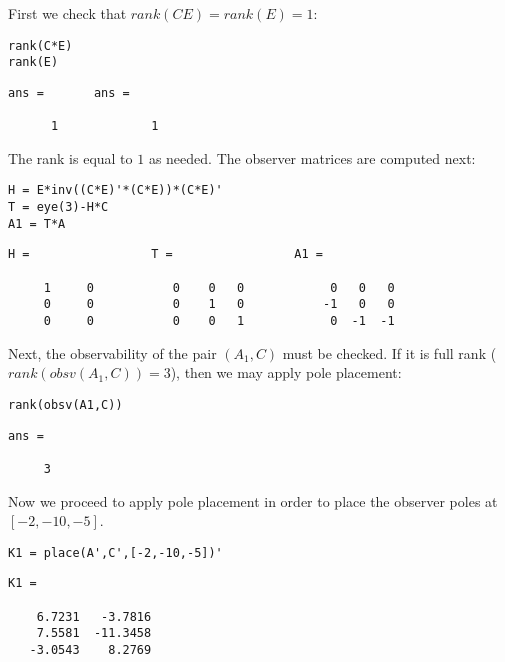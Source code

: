 \documentclass{amsart}
\theoremstyle{definition}
\theoremstyle{remark}
\numberwithin{equation}{section}
\begin{document}
\begin{par}
\noindent First we check that $rank(CE) = rank(E) = 1$:
\end{par} 
\begin{verbatim}
rank(C*E)
rank(E)
\end{verbatim}

        \color{lightgray} \begin{verbatim}
ans =       ans =

      1             1
\end{verbatim} \color{black}

\begin{par}
The rank is equal to $1$ as needed. The observer matrices are computed next:
\end{par}



\begin{verbatim}
H = E*inv((C*E)'*(C*E))*(C*E)'
T = eye(3)-H*C
A1 = T*A
\end{verbatim}
        \color{lightgray} \begin{verbatim}
H =                 T =                 A1 =

     1     0           0    0   0            0   0   0
     0     0           0    1   0           -1   0   0
     0     0           0    0   1            0  -1  -1

\end{verbatim} \color{black}

\begin{par}
Next, the observability of the pair $(A_1,C)$ must be checked. If it is full rank ($rank(obsv(A_1,C))=3$), then we may apply pole placement:
\end{par}
\begin{verbatim}
rank(obsv(A1,C))
\end{verbatim}

        \color{lightgray} \begin{verbatim}
ans =

     3

\end{verbatim} \color{black}
    
Now we proceed to apply pole placement in order to place the observer poles at $[-2,-10,-5]$.

\begin{verbatim}
K1 = place(A',C',[-2,-10,-5])'
\end{verbatim}

        \color{lightgray} \begin{verbatim}
K1 =

    6.7231   -3.7816
    7.5581  -11.3458
   -3.0543    8.2769

\end{verbatim} \color{black}
\end{document}
